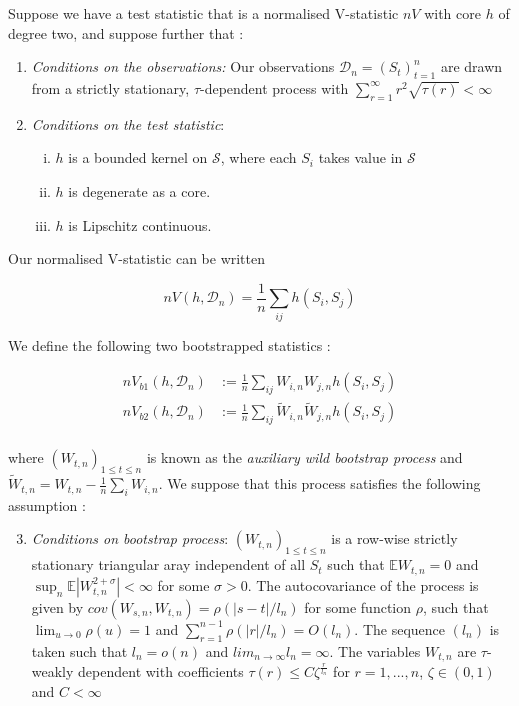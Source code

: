 \documentclass[12pt]{article}
\numberwithin{claim}{section}
\numberwithin{lemma}{section}
\numberwithin{theorem}{section}
\begin{document}
Suppose we have a test statistic that is a normalised V-statistic $nV$ with core $h$ of degree two, and suppose further that \cite{leucht2013dependent}\cite{chwialkowski2014wild}:

\begin{enumerate}[(1)]
\item \emph{Conditions on the observations:} Our observations $\mathcal{D}_n = (S_t)_{t=1}^n$ are drawn from a strictly stationary, $\tau$-dependent process with $\sum_{r=1}^\infty r^2 \sqrt{\tau(r)} < \infty$

\item \emph{Conditions on the test statistic}:
\begin{enumerate}[(i)]
\item $h$ is a bounded kernel on $\mathcal{S}$, where each $S_i$ takes value in $\mathcal{S}$
\item $h$ is degenerate as a core.
\item $h$ is Lipschitz continuous.
\end{enumerate}
\end{enumerate}

Our normalised V-statistic can be written

\[nV(h,\mathcal{D}_n) = \frac{1}{n} \sum_{ij} h(S_i,S_j)\]

We define the following two bootstrapped statistics \cite{chwialkowski2014wild}:

\begin{align*}
nV_{b1}(h,\mathcal{D}_n)& := \frac{1}{n} \sum_{ij} W_{i,n}W_{j,n}h(S_i,S_j) \\
nV_{b2}(h,\mathcal{D}_n)& := \frac{1}{n} \sum_{ij} \tilde{W}_{i,n}\tilde{W}_{j,n}h(S_i,S_j) \\
\end{align*}

where $(W_{t,n})_{1\leq t \leq n}$ is known as the \emph{auxiliary wild bootstrap process} and $\tilde{W}_{t,n} = W_{t,n} - \frac{1}{n} \sum_i W_{i,n}$. We suppose that this process satisfies the following assumption \cite{chwialkowski2014wild}: 

\begin{enumerate}[(1)]
  \setcounter{enumi}{2}
  \item \emph{Conditions on bootstrap process}: $(W_{t,n})_{1\leq t \leq n}$ is a row-wise strictly stationary triangular aray independent of all $S_t$ such that $\mathbb{E}W_{t,n} = 0$ and $\sup_n \mathbb{E}|W_{t,n}^{2+\sigma}| < \infty$ for some $\sigma > 0$. The autocovariance of the process is given by $cov(W_{s,n},W_{t,n}) = \rho(|s-t|/l_n)$ for some function $\rho$, such that $\lim_{u \longrightarrow 0} \rho (u) = 1$ and $\sum_{r=1}^{n-1} \rho(|r|/l_n) = O(l_n)$. The sequence $(l_n)$ is taken such that $l_n = o(n)$ and $lim_{n\longrightarrow \infty} l_n = \infty$. The variables $W_{t,n}$ are $\tau$-weakly dependent with coefficients $\tau (r) \leq C\zeta^{ \frac{r}{l_n}}$ for $r = 1,...,n$, $\zeta \in (0,1)$ and $C <\infty$
\end{enumerate}
\end{document}
